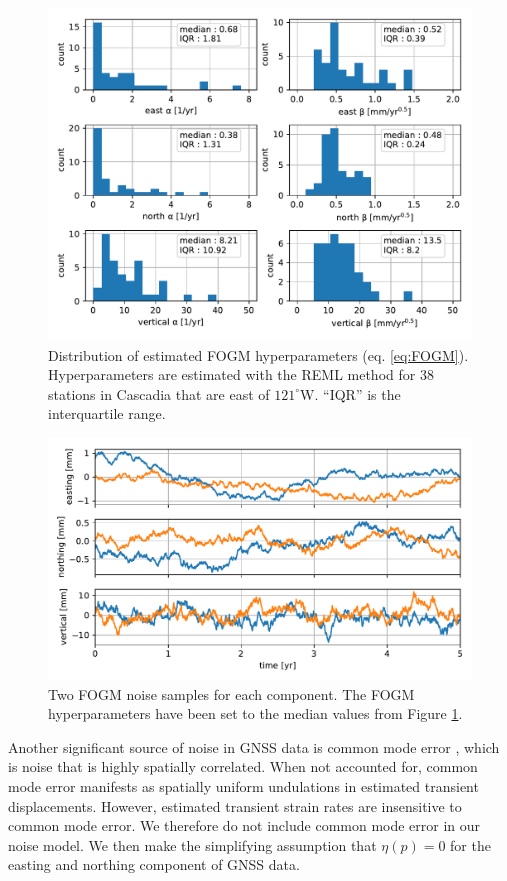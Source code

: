 \documentclass[extra,mreferee]{gji}
\begin{document}
\begin{figure}
\includegraphics{figures/noise/noise-params.pdf}
\caption{Distribution of estimated FOGM hyperparameters (eq. \ref{eq:FOGM}). Hyperparameters are estimated with the REML method for 38 stations in Cascadia that are east of $121^\circ$W. ``IQR'' is the interquartile range.}   
\label{fig:NoiseParams}
\end{figure}

\begin{figure}
\includegraphics{figures/noise/noise-samples.pdf}
\caption{Two FOGM noise samples for each component. The FOGM hyperparameters have been set to the median values from Figure \ref{fig:NoiseParams}.}   
\label{fig:NoiseSamples}
\end{figure}

Another significant source of noise in GNSS data is common mode error \citep[e.g.,][]{Wdowinski1997,Dong2006}, which is noise that is highly spatially correlated. When not accounted for, common mode error manifests as spatially uniform undulations in estimated transient displacements. However, estimated transient strain rates are insensitive to common mode error. We therefore do not include common mode error in our noise model. We then make the simplifying assumption that $\eta(p) = 0$ for the easting and northing component of GNSS data.  
\end{document}
